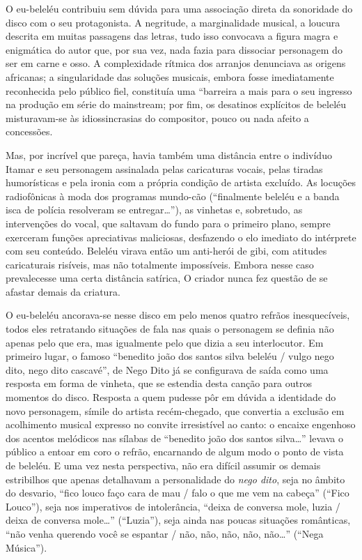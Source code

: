 O eu-beleléu contribuiu sem dúvida para uma associação direta
da sonoridade do disco com o seu protagonista. A negritude, a
marginalidade musical, a loucura descrita em muitas passagens das
letras, tudo isso convocava a figura magra e enigmática do autor que,
por sua vez, nada fazia para dissociar personagem do ser em carne e
osso. A complexidade rítmica dos arranjos denunciava as origens
africanas; a singularidade das soluções musicais, embora fosse
imediatamente reconhecida pelo público fiel, constituía uma ``barreira a
mais para o seu ingresso na produção em série do mainstream; por fim, os
desatinos explícitos de beleléu misturavam-se às idiossincrasias do
compositor, pouco ou nada afeito a concessões.

Mas, por incrível que pareça, havia também uma distância entre o
indivíduo Itamar e seu personagem assinalada pelas caricaturas vocais,
pelas tiradas humorísticas e pela ironia com a própria condição de
artista excluído. As locuções radiofônicas à moda dos programas
mundo-cão (``finalmente beleléu e a banda isca de polícia resolveram se
entregar\ldots''), as vinhetas e, sobretudo, as intervenções do vocal, que
saltavam do fundo para o primeiro plano, sempre exerceram funções
apreciativas maliciosas, desfazendo o elo imediato do intérprete com seu
conteúdo. Beleléu virava então um anti-herói de gibi, com atitudes
caricaturais risíveis, mas não totalmente impossíveis. Embora nesse caso
prevalecesse uma certa distância satírica, O criador nunca fez questão
de se afastar demais da criatura.

O eu-beleléu ancorava-se nesse disco em pelo menos quatro refrãos
inesquecíveis, todos eles retratando situações de fala nas quais o
personagem se definia não apenas pelo que era, mas igualmente pelo que
dizia a seu interlocutor. Em primeiro lugar, o famoso ``benedito joão
dos santos silva beleléu / vulgo nego dito, nego dito cascavé'', de Nego
Dito já se configurava de saída \textbar{} como uma resposta em forma de
vinheta, que se estendia desta canção para outros momentos do disco.
Resposta a quem pudesse pôr em dúvida a identidade do novo personagem,
símile do artista recém-chegado, que convertia a exclusão em acolhimento
musical expresso no convite irresistível ao canto: o encaixe engenhoso
dos acentos melódicos nas sílabas de ``benedito joão dos santos
silva\ldots'' levava o público a entoar em coro o refrão, encarnando de
algum modo o ponto de vista de beleléu. E uma vez nesta perspectiva, não
era difícil assumir os demais estribilhos que apenas detalhavam a
personalidade do \textit{nego dito}, seja no âmbito do desvario, ``fico louco
faço cara de mau / falo o que me vem na cabeça'' (``Fico Louco''), seja nos
imperativos de intolerância, \textbar{} ``deixa de conversa mole, luzia
/ deixa de conversa mole\ldots'' (``Luzia''), seja ainda nas poucas situações
românticas, ``não venha querendo você se espantar / não, não, não, não,
não\ldots'' (``Nega Música'').

